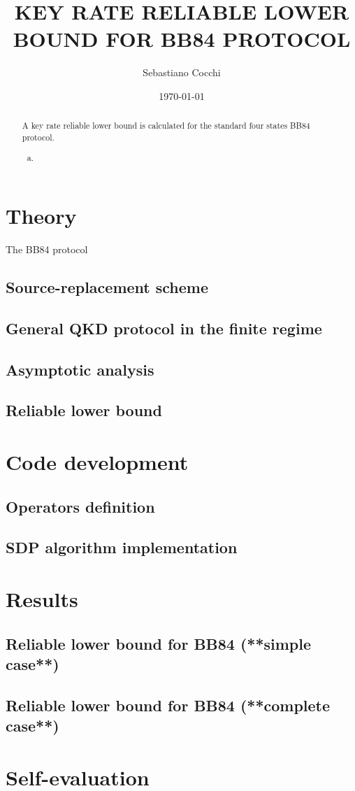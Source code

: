 \documentclass[12]{article}
\title{KEY RATE RELIABLE LOWER BOUND FOR BB84 PROTOCOL}
\author{Sebastiano Cocchi }
\date{\today}
\theoremstyle{definition}
\theoremstyle{remark}
\theoremstyle{example}
\theoremstyle{corollary}
\theoremstyle{lemma}
\begin{document}
\maketitle

\begin{abstract}                %
A key rate reliable lower bound is calculated for the standard four states BB84 protocol.
\begin{enumerate}[(a)]
\item 
\end{enumerate}\end{abstract}

\section{Theory}
The BB84 protocol
 \subsection{Source-replacement scheme}
 \subsection{General QKD protocol in the finite regime}

 \subsection{Asymptotic analysis}

 \subsection{Reliable lower bound}

\section{Code development}
 \subsection{Operators definition}

 \subsection{SDP algorithm implementation}

\section{Results}
 \subsection{Reliable lower bound for BB84 (**simple case**)}

 \subsection{Reliable lower bound for BB84 (**complete case**)}

\section{Self-evaluation}
\end{document}

